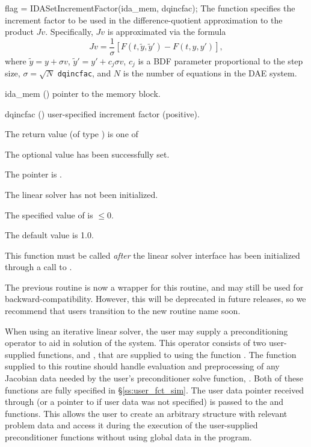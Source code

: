 {
{
  flag = IDASetIncrementFactor(ida\_mem, dqincfac);
}
{
  The function  specifies the increment
  factor to be used in the difference-quotient approximation to the
  product $Jv$.  Specifically, $Jv$ is approximated via the formula
  \[
    Jv = \frac{1}{\sigma}\left[F(t,\tilde{y},\tilde{y}') - F(t,y,y')\right],
  \]
  where $\tilde{y} = y + \sigma v$,  $\tilde{y}' = y' + c_j \sigma v$,
  $c_j$ is a BDF parameter proportional to the step size, $\sigma
  = \sqrt{N}$ \texttt{dqincfac}, and $N$ is the number of equations in
  the DAE system.
}
{
  \begin{args}[dqincfac]
  \item[ida\_mem] ()
    pointer to the {\idas} memory block.
  \item[dqincfac] ()
    user-specified increment factor (positive).
  \end{args}
}
{
  The return value  (of type ) is one of
  \begin{args}
  \item[\Id{IDALS\_SUCCESS}]
    The optional value has been successfully set.
  \item[\Id{IDALS\_MEM\_NULL}]
    The  pointer is .
  \item[\Id{IDALS\_LMEM\_NULL}]
    The {\idals} linear solver has not been initialized.
  \item[\Id{IDALS\_ILL\_INPUT}]
    The specified value of  is $\le 0$.
  \end{args}
}
{
  The default value is 1.0.

  This function must be called \emph{after} the {\idals} linear solver
  interface has been initialized through a call to
  .

  The previous routine  is now a wrapper for
  this routine, and may still be used for backward-compatibility.
  However, this will be deprecated in future releases, so we recommend
  that users transition to the new routine name soon.
}
When using an iterative linear solver, the user may supply a
preconditioning operator to aid in solution of the system.  This
operator consists of two user-supplied functions,  and
, that are supplied to {\ida} using the function
.  The  function supplied to
this routine should handle evaluation and preprocessing of any
Jacobian data needed by the user's preconditioner solve function,
.  Both of these functions are fully specified in
\S\ref{ss:user_fct_sim}.  The user data pointer received through
 (or a pointer to  if user data was not
specified) is passed to the  and  functions.
This allows the user to create an arbitrary structure with relevant
problem data and access it during the execution of the user-supplied
preconditioner functions without using global data in the program.

}
